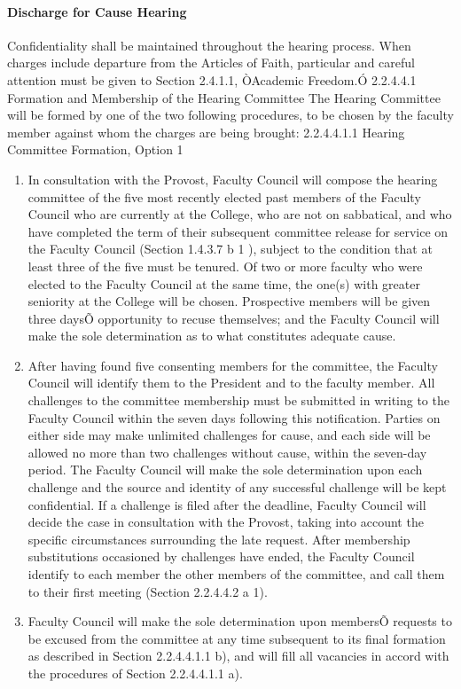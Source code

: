 \documentclass[letterpaper, 11pt]{article}
\begin{document}
			\paragraph{Discharge for Cause Hearing}
				Confidentiality shall be maintained throughout the hearing process.  When charges include departure from the Articles of Faith, particular and careful attention must be given to Section 2.4.1.1, ÒAcademic Freedom.Ó
				2.2.4.4.1 Formation and Membership of the Hearing Committee
				The Hearing Committee will be formed by one of the two following procedures, to be chosen by the faculty member against whom the charges are being brought:
				2.2.4.4.1.1 Hearing Committee Formation, Option 1
				\begin{enumerate}[label=\alph*)]
					\item{In consultation with the Provost, Faculty Council will compose the hearing committee of the five most recently elected past members of the Faculty Council who are currently at the College, who are not on sabbatical, and who have completed the term of their subsequent committee release for service on the Faculty Council (Section 1.4.3.7 b 1 ), subject to the condition that at least three of the five must be tenured.  Of two or more faculty who were elected to the Faculty Council at the same time, the one(s) with greater seniority at the College will be chosen.  Prospective members will be given three daysÕ opportunity to recuse themselves; and the Faculty Council will make the sole determination as to what constitutes adequate cause.}
					\item{After having found five consenting members for the committee, the Faculty Council will identify them to the President and to the faculty member.  All challenges to the committee membership must be submitted in writing to the Faculty Council within the seven days following this notification.  Parties on either side may make unlimited challenges for cause, and each side will be allowed no more than two challenges without cause, within the seven-day period.  The Faculty Council will make the sole determination upon each challenge and the source and identity of any successful challenge will be kept confidential.  If a challenge is filed after the deadline, Faculty Council will decide the case in consultation with the Provost, taking into account the specific circumstances surrounding the late request.  After membership substitutions occasioned by challenges have ended, the Faculty Council identify to each member the other members of the committee, and call them to their first meeting (Section 2.2.4.4.2 a 1).}
					\item{Faculty Council will make the sole determination upon membersÕ requests to be excused from the committee at any time subsequent to its final formation as described in Section 2.2.4.4.1.1 b), and will fill all vacancies in accord with the procedures of Section 2.2.4.4.1.1 a).}
				\end{enumerate}
\end{document}
